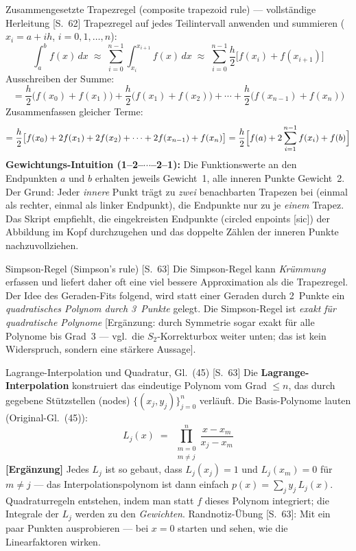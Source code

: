 \begin{satzbox}{Zusammengesetzte Trapezregel (composite trapezoid rule) --- vollständige Herleitung [S.~62]}
Trapezregel auf jedes Teilintervall anwenden und summieren ($x_i = a + ih$,
$i = 0, 1, \ldots, n$):
\[
  \int_a^b f(x)\,dx \;\approx\; \sum_{i=0}^{n-1}\int_{x_i}^{x_{i+1}} f(x)\,dx
  \;\approx\; \sum_{i=0}^{n-1} \frac{h}{2}\bigl[f(x_i) + f(x_{i+1})\bigr]
\]
Ausschreiben der Summe:
\[
  = \frac{h}{2}\bigl(f(x_0)+f(x_1)\bigr) + \frac{h}{2}\bigl(f(x_1)+f(x_2)\bigr)
    + \cdots + \frac{h}{2}\bigl(f(x_{n-1})+f(x_n)\bigr)
\]
Zusammenfassen gleicher Terme:
\[
  = \frac{h}{2}\bigl[f(x_0) + 2f(x_1) + 2f(x_2) + \cdots + 2f(x_{n-1}) + f(x_n)\bigr]
  = \frac{h}{2}\Bigl[f(a) + 2\sum_{i=1}^{n-1} f(x_i) + f(b)\Bigr]
\]
\textbf{Gewichtungs-Intuition (1--2--$\cdots$--2--1):} Die Funktionswerte an den
Endpunkten $a$ und $b$ erhalten jeweils Gewicht~1, alle inneren Punkte Gewicht~2.
Der Grund: Jeder \emph{innere} Punkt trägt zu \emph{zwei} benachbarten Trapezen bei
(einmal als rechter, einmal als linker Endpunkt), die Endpunkte nur zu je
\emph{einem} Trapez. Das Skript empfiehlt, die eingekreisten Endpunkte
(\glqq circled enpoints\grqq{} [sic]) der Abbildung im Kopf durchzugehen und das
doppelte Zählen der inneren Punkte nachzuvollziehen.
\end{satzbox}

\begin{defbox}{Simpson-Regel (Simpson's rule) [S.~63]}
Die Simpson-Regel kann \emph{Krümmung} erfassen und liefert daher oft eine viel
bessere Approximation als die Trapezregel. Der Idee des Geraden-Fits folgend, wird
statt einer Geraden durch 2~Punkte ein \emph{quadratisches Polynom durch 3~Punkte}
gelegt. Die Simpson-Regel ist \emph{exakt für quadratische Polynome} [Ergänzung: durch
Symmetrie sogar exakt für alle Polynome bis Grad~3 --- vgl.\ die $S_2$-Korrekturbox
weiter unten; das ist kein Widerspruch, sondern eine stärkere Aussage].
\end{defbox}

\begin{defbox}{Lagrange-Interpolation und Quadratur, Gl.~(45) [S.~63]}
Die \textbf{Lagrange-Interpolation} konstruiert das eindeutige Polynom vom Grad
$\le n$, das durch gegebene Stützstellen (nodes) $\{(x_j, y_j)\}_{j=0}^{n}$ verläuft.
Die Basis-Polynome lauten (Original-Gl.~(45)):
\[
  L_j(x) \;=\; \prod_{\substack{m=0 \\ m\neq j}}^{n} \frac{x - x_m}{x_j - x_m} \tag{45}
\]
\textbf{[Ergänzung]} Jedes $L_j$ ist so gebaut, dass $L_j(x_j) = 1$ und
$L_j(x_m) = 0$ für $m \ne j$ --- das Interpolationspolynom ist dann einfach
$p(x) = \sum_j y_j\,L_j(x)$. Quadraturregeln entstehen, indem man statt $f$ dieses
Polynom integriert; die Integrale der $L_j$ werden zu den \emph{Gewichten}.
Randnotiz-Übung [S.~63]: Mit ein paar Punkten ausprobieren --- bei $x = 0$ starten
und sehen, wie die Linearfaktoren wirken.
\end{defbox}

